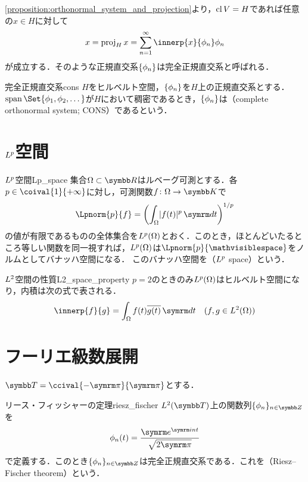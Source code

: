 \documentclass[../../main]{subfiles}
\begin{document}
\cref{proposition:orthonormal_system_and_projection}より，\(\operatorname{cl} V=H\)であれば任意の\(x\in H\)に対して
\[
  x = \proj_Hx
  = \sum_{n=1}^\infty\innerp{x}{\phi_n}\phi_n
\]
が成立する．そのような正規直交系\(\lbrace\phi_n\rbrace\)は完全正規直交系と呼ばれる．

\begin{definition}{完全正規直交系}{cons}
  \(H\)をヒルベルト空間，\(\lbrace\phi_n\rbrace\)を\(H\)上の正規直交系とする．\(\spannedby\Set{\phi_1,\phi_2,\dotsc}\)が\(H\)において稠密であるとき，\(\lbrace\phi_n\rbrace\)は（complete orthonormal system; CONS）であるという．
\end{definition}

\section{\texorpdfstring{\(\Lebesgue{p}\)}{Lp}空間}
\label{section:lp_space}

\begin{definition}{\(\Lebesgue{p}\)空間}{Lp_space}
  集合\(\Omega\subset\numset{R}\)はルベーグ可測とする．各\(p\in\coival{1}{+\infty}\)に対し，可測関数\(f\colon\Omega\to\numset{K}\)で
  \[
    \Lpnorm{p}{f} = \pqty*{\int_\Omega\abs{f(t)}^p\intd{t}}^{1/p}
  \]
  の値が有限であるものの全体集合を\(\Lebesgue{p}(\Omega)\)とおく．このとき，ほとんどいたるところ等しい関数を同一視すれば，\(\Lebesgue{p}(\Omega)\)は\(\Lpnorm{p}{\holder}\)をノルムとしてバナッハ空間になる．
  このバナッハ空間を（\(\Lebesgue{p}\) space）という．
\end{definition}

\begin{proposition}{\(\Lebesgue{2}\)空間の性質}{L2_space_property}
  \(p=2\)のときのみ\(\Lebesgue{p}(\Omega)\)はヒルベルト空間になり，内積は次の式で表される．
  \[
    \innerp{f}{g} = \int_\Omega f(t)\conj*{g(t)}\intd{t}\quad(f,g\in\Lebesgue{2}(\Omega))
  \]
\end{proposition}

\section{フーリエ級数展開}

\(\torus=\ccival{-\krez}{\krez}\)とする．

\begin{theorem}{リース・フィッシャーの定理}{riesz_fischer}
  \(\Lebesgue{2}(\torus)\)上の関数列\(\seq{\phi_n}_{n\in\numset{Z}}\)を
  \[
    \phi_n(t) = \frac{\napr^{\iuni nt}}{\sqrt{2\krez}}
  \]
  で定義する．このとき\(\seq{\phi_n}_{n\in\numset{Z}}\)は完全正規直交系である．これを（Riesz–Fischer theorem）という．
\end{theorem}
\end{document}
